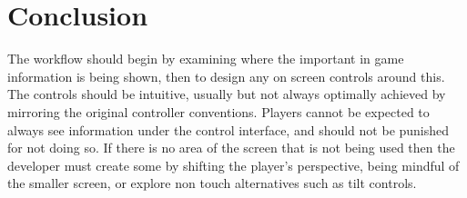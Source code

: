 \documentclass{scrartcl}
\begin{document}
\section*{Conclusion}

The workflow should begin by examining where the important in game information is being shown, then to design any on screen controls around this.  The controls should be intuitive, usually but not always optimally achieved by mirroring the original controller conventions.  Players cannot be expected to always see information under the control interface, and should not be punished for not doing so.  If there is no area of the screen that is not being used then the developer must create some by shifting the player's perspective, being mindful of the smaller screen, or explore non touch alternatives such as tilt controls. 



\end{document}
